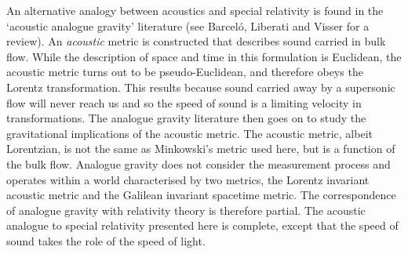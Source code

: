 \documentclass[10pt, fleqn,final,showtrims,oldfontcommands, article,a4paper,oneside]{memoir} %
\begin{document}
An alternative  analogy between acoustics and special relativity is found in the `acoustic analogue gravity' literature (see Barcel{\'o}, Liberati and Visser\cite{Barcelo2005} for a review).
An {\em acoustic} metric is constructed that describes sound carried in bulk flow.
While the description of space and time in this formulation is Euclidean, the acoustic metric turns out to be pseudo-Euclidean,
and therefore obeys the Lorentz transformation.
This results because  sound carried away by a supersonic flow will never reach us
and so the speed of sound is a limiting velocity in transformations.
The analogue gravity literature then goes on to study the gravitational implications of the acoustic metric.
The acoustic metric, albeit Lorentzian, is not the same as Minkowski's metric used here, 
but is a function of the bulk flow.
Analogue gravity does not consider the measurement process and  operates within a world characterised by two metrics, 
the Lorentz invariant acoustic metric
 and the Galilean invariant spacetime  metric.
The correspondence of analogue gravity with relativity theory is therefore partial.
The acoustic analogue to special relativity presented here is complete,
except that the speed of sound takes the role of the speed of light.






\end{document}
